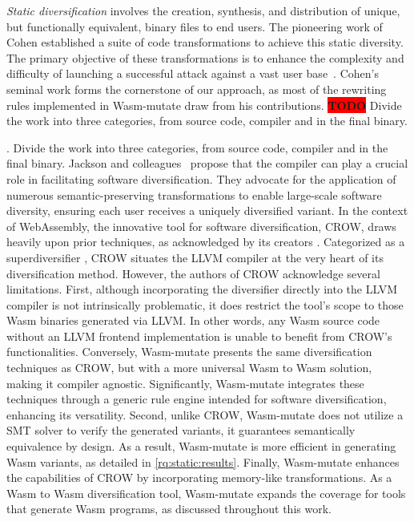 \documentclass[sigplan,screen]{acmart}
\newcommand*\badge[1]{ \colorbox{red}{\color{white}#1}}
\newcommand{\tool}{Wasm-mutate\xspace}
\newcommand{\wasm}{Wasm\xspace}
\newcommand{\Wasm}{WebAssembly\xspace}
\newcommand{\todo}[1]{%
\refstepcounter{todo}
\noindent\textbf{\badge{TODO}} {\color{red}#1}
\addcontentsline{td}{todo}
{\color{red}\thesection.\thetodo\xspace #1}}
\begin{document}
\emph{Static diversification} involves the creation, synthesis, and distribution of unique, but functionally equivalent, binary files to end users. 
The pioneering work of Cohen \cite{cohen1993operating} established a suite of code transformations to achieve this static diversity. 
The primary objective of these transformations is to enhance the complexity and difficulty of launching a successful attack against a vast user base~\cite{cohen1993operating}. 
Cohen's seminal work forms the cornerstone of our approach, as most of the rewriting rules implemented in \tool draw from his contributions.
\todo{Divide the work into three categories, from source code, compiler and in the final binary.}
Jackson and colleagues~\cite{jackson2011compiler} propose that the compiler can play a crucial role in facilitating software diversification. 
They advocate for the application of numerous semantic-preserving transformations to enable large-scale software diversity, ensuring each user receives a uniquely diversified variant. 
In the context of \Wasm, 
the innovative tool for software diversification, CROW, draws heavily upon prior techniques, as acknowledged by its creators \cite{arteaga2020crow}. 
Categorized as a superdiversifier \cite{jacob2008superdiversifier}, CROW situates the LLVM compiler at the very heart of its diversification method.
However, the authors of CROW acknowledge several limitations. 
First, although incorporating the diversifier directly into the LLVM compiler is not intrinsically problematic, it does restrict the tool's scope to those \wasm binaries generated via LLVM. 
In other words, any \wasm source code without an LLVM frontend implementation is unable to benefit from CROW's functionalities.
Conversely, \tool presents the same diversification techniques as CROW, but with a more universal \wasm to \wasm solution, making it compiler agnostic. 
Significantly, \tool integrates these techniques through a generic rule engine intended for software diversification, enhancing its versatility.
Second, unlike CROW, \tool does not utilize a SMT solver to verify the generated variants, it guarantees semantically equivalence by design. 
As a result, \tool is more efficient in generating \wasm variants, as detailed in \autoref{rq:static:results}.
Finally, \tool enhances the capabilities of CROW by incorporating memory-like transformations. 
As a \wasm to \wasm diversification tool, \tool expands the coverage for tools that generate \wasm programs, as discussed throughout this work.
\end{document}
